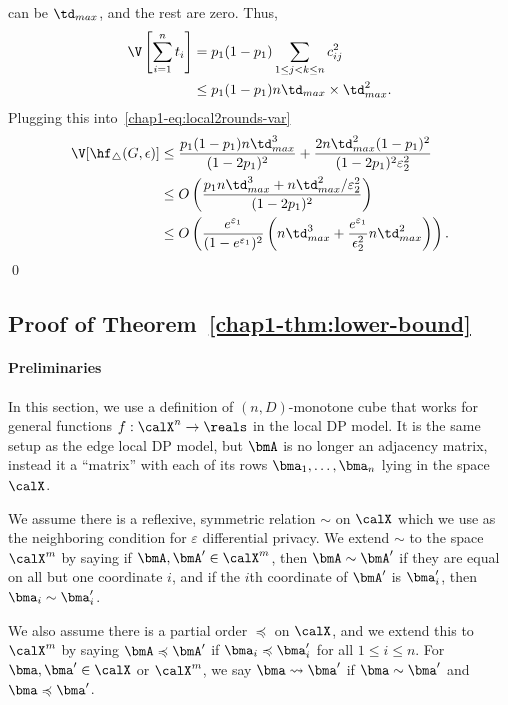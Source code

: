   can be $\td_{max}$, and the rest are zero. Thus,
  \begin{align*}
    \V\left[\sum_{i=1}^n t_i \right] &=
    p_1(1-p_1) \sum_{1 \leq j < k \leq n} c_{ij}^2 \\ 
    &\leq p_1(1-p_1) n\td_{max} \times \td_{max}^2.
  \end{align*}
  Plugging this into~\eqref{chap1-eq:local2rounds-var}
  \begin{align*}
    \V[\hf_\triangle(G,\epsilon)] &\leq \frac{p_1(1-p_1)n\td_{max}^3}{(1-2p_1)^2} +
    \frac{2n\td_{max}^2(1-p_1)^2}{(1-2p_1)^2\varepsilon_2^2} \\
    &\leq O\left(\frac{p_1 n\td_{max}^3 + n\td_{max}^2/\varepsilon_2^2}{(1-2p_1)^2} \right) \\
    &\leq O\left(\frac{e^{\varepsilon_1}}{(1-e^{\varepsilon_1})^2} \left(n\td_{max}^3 +
    \frac{e^{\varepsilon_1}}{\epsilon_2^2}n\td_{max}^2\right)\right).
  \end{align*}
  \qed

\subsection{Proof of Theorem~\ref{chap1-thm:lower-bound}}

\label{chap1-sub:proof_thm_lower-bound}

\paragraph{Preliminaries}
In this section, we use a definition of $(n,D)$-monotone cube that works for
general functions $f : \calX^{n} \rightarrow \reals$ in the
local DP model. It is the same setup as the edge local DP model, but $\bmA$ is
no longer an adjacency
matrix, instead it a ``matrix'' with each of its rows $\bma_1,\ldots,\bma_n$
lying in the space $\calX$. 

We assume there is a reflexive,
symmetric relation $\sim$ on $\calX$ which we use as the neighboring condition for
$\varepsilon$ differential privacy.
We extend $\sim$ to the space $\calX^m$ by saying
if $\bmA,\bmA' \in
\calX^m$, then $\bmA \sim \bmA'$ if they are equal on all but one coordinate
$i$, and if the $i$th coordinate of $\bmA'$ is $\bma_i'$, then $\bma_i \sim
\bma_i'$.

We also assume there is a partial order $\preccurlyeq$ on $\calX$, and we extend
this to $\calX^m$ by saying $\bmA \preccurlyeq \bmA'$ if $\bma_i \preccurlyeq
\bma_i'$ for all $1 \leq i \leq n$.
For $\bma, \bma' \in \calX$ or $\calX^m$, we say $\bma \leadsto \bma'$ if $\bma
\sim \bma'$ and $\bma \preccurlyeq \bma'$.

